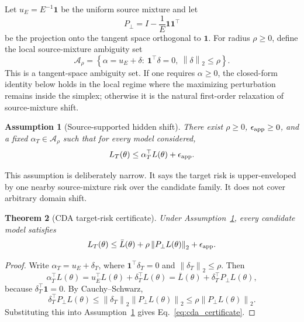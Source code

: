 \documentclass{article}
\newtheorem{theorem}{Theorem}[section]
\newtheorem{assumption}[theorem]{Assumption}
\theoremstyle{definition}
\newcommand{\cA}{\mathcal{A}}
\newcommand{\one}{\mathbf{1}}
\newcommand{\norm}[1]{\left\lVert #1 \right\rVert}
\newcommand{\braces}[1]{\left\{ #1 \right\}}
\newcommand{\ub}{u_E}
\begin{document}
Let \(\ub=E^{-1}\one\) be the uniform source mixture and let
\[
P_\perp = I-\frac{1}{E}\one\one^\top
\]
be the projection onto the tangent space orthogonal to \(\one\). For radius \(\rho\ge 0\), define the local source-mixture ambiguity set
\begin{equation}
\cA_\rho
=
\braces{\alpha=\ub+\delta:\ \one^\top\delta=0,\ \norm{\delta}_2\le \rho}.
\label{eq:ambiguity_set}
\end{equation}
This is a tangent-space ambiguity set. If one requires \(\alpha\ge 0\), the closed-form identity below holds in the local regime where the maximizing perturbation remains inside the simplex; otherwise it is the natural first-order relaxation of source-mixture shift.

\begin{assumption}[Source-supported hidden shift]
\label{ass:hidden_shift}
There exist \(\rho\ge 0\), \(\epsilon_{\rm app}\ge 0\), and a fixed \(\alpha_T\in\cA_\rho\) such that for every model considered,
\begin{equation}
L_T(\theta) \le \alpha_T^\top L(\theta)+\epsilon_{\rm app}.
\label{eq:hidden_shift}
\end{equation}
\end{assumption}

This assumption is deliberately narrow. It says the target risk is upper-enveloped by one nearby source-mixture risk over the candidate family. It does not cover arbitrary domain shift.

\begin{theorem}[CDA target-risk certificate]
\label{thm:cda_certificate}
Under Assumption~\ref{ass:hidden_shift}, every candidate model satisfies
\begin{equation}
L_T(\theta)
\le
\bar L(\theta)+\rho\norm{P_\perp L(\theta)}_2+\epsilon_{\rm app}.
\label{eq:cda_certificate}
\end{equation}
\end{theorem}

\begin{proof}
Write \(\alpha_T=\ub+\delta_T\), where \(\one^\top\delta_T=0\) and \(\norm{\delta_T}_2\le \rho\). Then
\[
\alpha_T^\top L(\theta)
=
\ub^\top L(\theta)+\delta_T^\top L(\theta)
=
\bar L(\theta)+\delta_T^\top P_\perp L(\theta),
\]
because \(\delta_T^\top\one=0\). By Cauchy--Schwarz,
\[
\delta_T^\top P_\perp L(\theta)
\le
\norm{\delta_T}_2\norm{P_\perp L(\theta)}_2
\le
\rho\norm{P_\perp L(\theta)}_2.
\]
Substituting this into Assumption~\ref{ass:hidden_shift} gives Eq.~\eqref{eq:cda_certificate}.
\end{proof}
\end{document}
